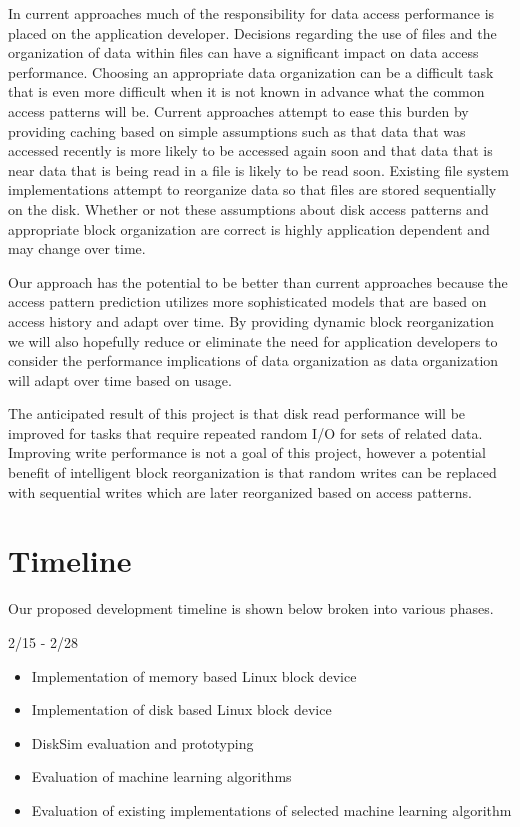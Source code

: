 \documentclass[letterpaper,twocolumn,10pt]{article}
\begin{document}
In current approaches much of the responsibility for data access performance is placed on the application developer.  Decisions regarding the use of files and the organization of data within files can have a significant impact on data access performance.  Choosing an appropriate data organization can be a difficult task that is even more difficult when it is not known in advance what the common access patterns will be.  Current approaches attempt to ease this burden by providing caching based on simple assumptions such as that data that was accessed recently is more likely to be accessed again soon and that data that is near data that is being read in a file is likely to be read soon.  Existing file system implementations attempt to reorganize data so that files are stored sequentially on the disk.  Whether or not these assumptions about disk access patterns and appropriate block organization are correct is highly application dependent and may change over time.

Our approach has the potential to be better than current approaches because the access pattern prediction utilizes more sophisticated models that are based on access history and adapt over time.  By providing dynamic block reorganization we will also hopefully reduce or eliminate the need for application developers to consider the performance implications of data organization as data organization will adapt over time based on usage. 

The anticipated result of this project is that disk read performance will be improved for tasks that require repeated random I/O for sets of related data.  Improving write performance is not a goal of this project, however a potential benefit of intelligent block reorganization is that random writes can be replaced with sequential writes which are later reorganized based on access patterns.

\section{Timeline}

Our proposed development timeline is shown below broken into various phases.

\begin{description}
\item[2/15 - 2/28]
\end{description}
\begin{itemize}
\setlength{\itemsep}{1pt}
\setlength{\parskip}{0pt}
\setlength{\parsep}{0pt}

\item Implementation of memory based Linux block device
\item Implementation of disk based Linux block device
\item DiskSim evaluation and prototyping
\item Evaluation of machine learning algorithms
\item Evaluation of existing implementations of selected machine learning algorithm
\end{itemize}
\end{document}
